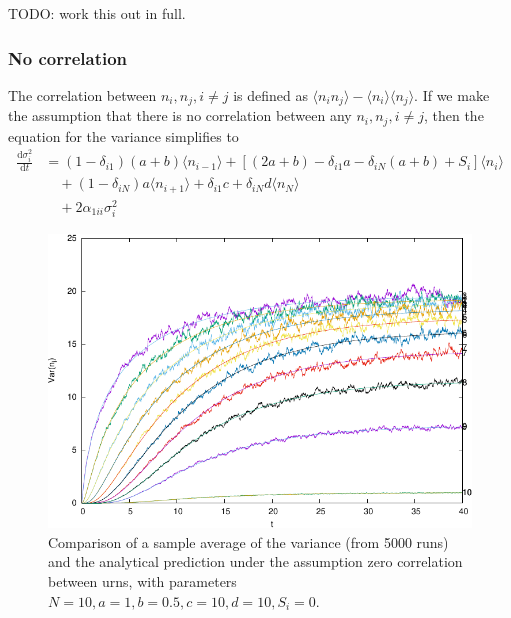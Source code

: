 \documentclass[a4paper,11pt]{article}
\numberwithin{equation}{section}
\newcommand{\diff}[2]{\frac{\mathrm{d} #1}{\mathrm{d} #2}}
\newcommand{\E}[1]{\langle #1 \rangle}
\begin{document}
TODO: work this out in full.

\subsubsection{No correlation}
The correlation between \(n_i, n_j, i\neq j\) is defined as \(\E{n_in_j} -
\E{n_i}\E{n_j}\).
If we make the assumption that there is no correlation between any \(n_i, n_j,
i\neq j\), then the equation for the variance simplifies to
\begin{equation}
    \begin{aligned}
        \diff{\sigma_i^2}{t} &= (1-\delta_{i1})(a+b)\E{n_{i-1}} +
        \left[(2a+b) - \delta_{i1}a - \delta_{iN}(a+b) + S_i\right]\E{n_i}\\
        &\quad+ (1-\delta_{iN})a\E{n_{i+1}} + \delta_{i1}c + \delta_{iN}d \E{n_N}\\
        &\quad+ 2 \alpha_{1ii} \sigma_i^2
    \end{aligned}
    \label{eqn:time_evo_variance_first_order_no_corr}
\end{equation}

\begin{figure}[ht!]
    \centering
    \includegraphics{figures/variance_first_order_no_corr}
    \caption{\label{fig:variance_first_order_no_corr} Comparison of a sample
average of the variance (from 5000 runs) and the analytical prediction under the
assumption zero correlation between urns, with parameters \(N=10,a=1,b=0.5,c=10,d=10,S_i=0\).}
\end{figure}

\FloatBarrier
\end{document}
